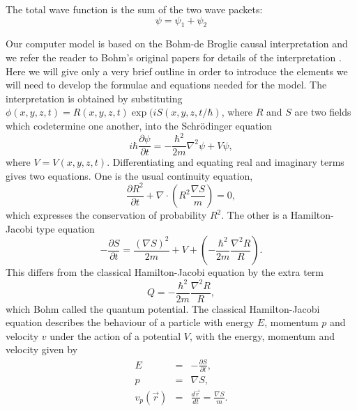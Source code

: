 \documentclass[12pt]{article}       %
\newcommand{\rb}{\mbox{$\vec{r}$}}
\begin{document}
The total wave function is the sum of the two wave packets:
\begin{equation}
\psi=\psi_1+\psi_2
\end{equation}

Our computer model is based on the Bohm-de Broglie causal interpretation and we refer the reader to Bohm's original papers for details of the interpretation \cite{B52}. Here we will give only a very brief outline in order to introduce the elements we will need to develop the formulae and equations needed for the model. The interpretation is obtained by substituting $\phi(x,y,z,t)=R(x,y,z,t)\exp(iS(x,y,z,t/\hbar)$, where $R$ and $S$ are two fields which codetermine one another, into the Schr\"{o}dinger equation
\[
i\hbar\frac{\partial \psi}{\partial t}=-\frac{\hbar^2}{2m}\nabla^2\psi+V\psi,
\]
where $V=V(x,y,z,t)$. Differentiating and equating real and imaginary terms gives two equations. One is the usual  continuity equation,
\begin{equation}
\frac{\partial R^{2}}{\partial t}+\nabla\cdot\left(R^{2}\frac{\nabla S}{m}\right)=0,
\end{equation}
which expresses the conservation of probability $R^2$. The other is a Hamilton-Jacobi type equation
\begin{equation}
 -\frac{\partial S}{\partial t}= \frac{(\nabla S)^{2}}{2m}+V+\left    (-\frac{\hbar^{2}}{2m}\frac{\nabla^{2} R}{R}\right).
\end{equation}
This differs from the classical  Hamilton-Jacobi equation by the extra term
\begin{equation}
Q=-\frac{\hbar^{2}}{2m}\frac{\nabla^{2} R}{R},
\end{equation}
which Bohm called the quantum potential. The classical  Hamilton-Jacobi equation describes the behaviour of a particle with energy $E$, momentum  $p$ and velocity  $v$ under the action of a potential $V$, with the energy, momentum and velocity given by
\begin{eqnarray}
E&=&-\frac{\partial S}{\partial t}, \nonumber\\
p&=&\nabla S,\nonumber\\
v_p(\rb)&=&\frac{d \rb}{dt}=\frac{\nabla S}{m}.  \label{ENMOM}
\end{eqnarray}
\end{document}
